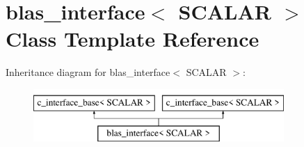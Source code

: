 \hypertarget{classblas__interface_3_01_s_c_a_l_a_r_01_4}{}\section{blas\+\_\+interface$<$ S\+C\+A\+L\+AR $>$ Class Template Reference}
\label{classblas__interface_3_01_s_c_a_l_a_r_01_4}
Inheritance diagram for blas\+\_\+interface$<$ S\+C\+A\+L\+AR $>$\+:\begin{figure}[H]
\begin{center}
\leavevmode
\includegraphics[height=2.000000cm]{classblas__interface_3_01_s_c_a_l_a_r_01_4}
\end{center}
\end{figure}
